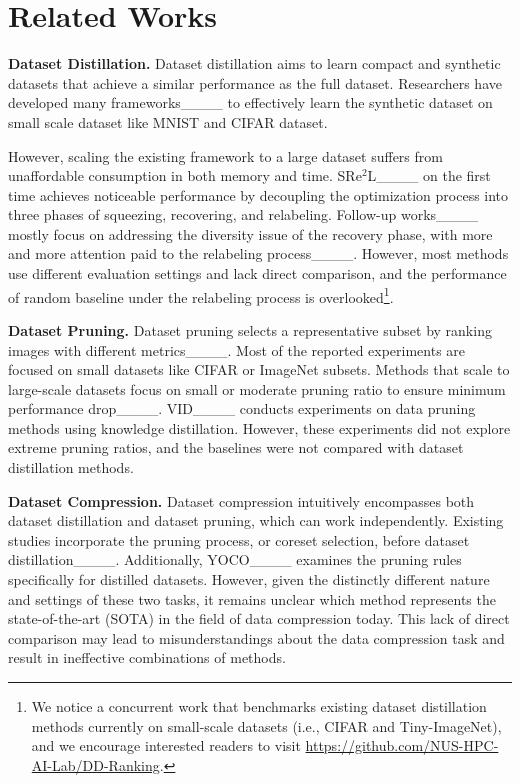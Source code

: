 \section{Related Works}
\label{sec:related}

\textbf{Dataset Distillation.}
Dataset distillation aims to learn compact and synthetic datasets that achieve a similar performance as the full dataset.
Researchers have developed many frameworks____ to effectively learn the synthetic dataset on small scale dataset like MNIST and CIFAR dataset.

However, scaling the existing framework to a large dataset suffers from unaffordable consumption in both memory and time.
SRe$^2$L____ on the first time achieves noticeable performance by decoupling the optimization process into three phases of squeezing, recovering, and relabeling. 
Follow-up works____ mostly focus on addressing the diversity issue of the recovery phase, with more and more attention paid to the relabeling process____.
However, most methods use different evaluation settings and lack direct comparison, and the performance of random baseline under the relabeling process is overlooked\footnote{We notice a concurrent work that benchmarks existing dataset distillation methods currently on small-scale datasets (i.e., CIFAR and Tiny-ImageNet), and we encourage interested readers to visit \href{https://github.com/NUS-HPC-AI-Lab/DD-Ranking}{https://github.com/NUS-HPC-AI-Lab/DD-Ranking}.}.

\textbf{Dataset Pruning.}
Dataset pruning selects a representative subset by ranking images with different metrics____. 
Most of the reported experiments are focused on small datasets like CIFAR or ImageNet subsets.
Methods that scale to large-scale datasets focus on small or moderate pruning ratio to ensure minimum performance drop____.
VID____ conducts experiments on data pruning methods using knowledge distillation. However, these experiments did not explore extreme pruning ratios, and the baselines were not compared with dataset distillation methods.

\textbf{Dataset Compression.}
Dataset compression intuitively encompasses both dataset distillation and dataset pruning, which can work independently. Existing studies incorporate the pruning process, or coreset selection, before dataset distillation____. Additionally, YOCO____ examines the pruning rules specifically for distilled datasets. However, given the distinctly different nature and settings of these two tasks, it remains unclear which method represents the state-of-the-art (SOTA) in the field of data compression today. This lack of direct comparison may lead to misunderstandings about the data compression task and result in ineffective combinations of methods.
